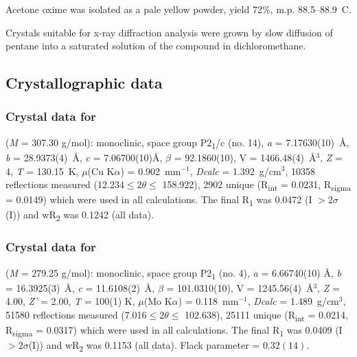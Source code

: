 \begin{refsection}
Acetone oxime  was isolated as a pale yellow powder, yield 72\%, m.p. 88.5--88.9\degree~C.

Crystals suitable for x-ray diffraction analysis were grown by slow diffusion of pentane into a saturated solution of the compound in dichloromethane.

\subsection{Crystallographic data}

\subsubsection{Crystal data for \texorpdfstring{}{C14H17N3O5}}
 (\emph{M} = 307.30 g/mol): monoclinic, space group P2\textsubscript{1}/c (no. 14), \emph{a} = 7.17630(10)~\AA , \emph{b} = 28.9373(4)~\AA , \emph{c} = 7.06700(10)\AA , $\beta$ = 92.1860(10)\degree, V = 1466.48(4)~\AA$^3$, \emph{Z} = 4, \emph{T} = 130.15~K, $\mu$(Cu K$\alpha$) = 0.902~mm$^{-1}$, \emph{Dcalc} = 1.392~g/cm$^3$, 10358 reflections measured (12.234\degree $\leq 2\theta \leq$ 158.922\degree), 2902 unique (R\textsubscript{int} = 0.0231, R\textsubscript{sigma} = 0.0149) which were used in all calculations. The final R\textsubscript{1} was 0.0472 (I $> 2\sigma$(I)) and wR\textsubscript{2} was 0.1242 (all data).

\subsubsection{Crystal data for \texorpdfstring{}{C12H13N3O5}}
 (\emph{M} = 279.25 g/mol): monoclinic, space group P2\textsubscript{1} (no. 4), \emph{a} = 6.66740(10) \AA, \emph{b} = 16.3925(3)~\AA, \emph{c} = 11.6108(2)~\AA, $\beta$ = 101.0310(10)\degree, V = 1245.56(4)~\AA$^3$, \emph{Z} = 4.00, \emph{Z'} = 2.00, \emph{T} = 100(1) K, $\mu$(Mo K$\alpha$) = 0.118~mm$^{-1}$, \emph{Dcalc} = 1.489~g/cm$^3$, 51580 reflections measured (7.016\degree $\leq 2\theta \leq$ 102.638\degree), 25111 unique (R\textsubscript{int} = 0.0214, R\textsubscript{sigma} = 0.0317) which were used in all calculations. The final R\textsubscript{1} was 0.0409 (I $> 2\sigma$(I)) and wR\textsubscript{2} was 0.1153 (all data). Flack parameter = $0.32(14)$.


\end{refsection}
